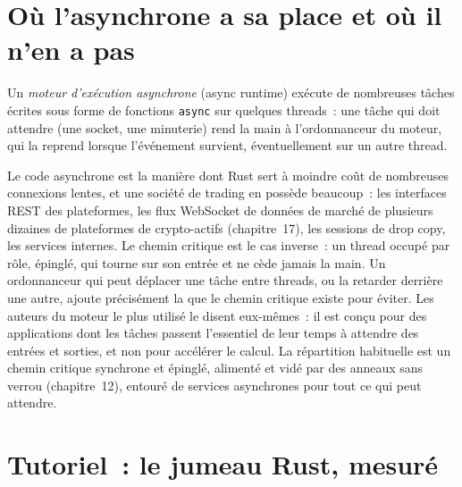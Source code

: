 \label{lst:ll:rust-for-low-latency:pin}

\section{Où l'asynchrone a sa place et où il n'en a pas}

\begin{definition}\label{def:ll:rust-for-low-latency:async}
Un \emph{moteur d'exécution asynchrone} (async runtime) exécute de nombreuses tâches écrites sous forme de fonctions \texttt{async} sur quelques threads~: une tâche
qui doit attendre (une socket, une minuterie) rend la main à l'ordonnanceur du moteur, qui la reprend lorsque l'événement
survient, éventuellement sur un autre thread.
\end{definition}

Le code asynchrone est la manière dont Rust sert à moindre coût de nombreuses connexions lentes, et une société de trading en possède beaucoup~: les interfaces REST des plateformes, les flux WebSocket
de données de marché de plusieurs dizaines de plateformes de crypto-actifs (chapitre~17), les sessions de drop copy, les services internes. Le chemin critique est le
cas inverse~: un thread occupé par rôle, épinglé, qui tourne sur son entrée et ne cède jamais la main. Un ordonnanceur qui peut déplacer une tâche entre
threads, ou la retarder derrière une autre, ajoute précisément la  que le chemin critique existe pour éviter. Les auteurs du moteur le
plus utilisé le disent eux-mêmes~: il est conçu pour des applications dont les tâches passent l'essentiel de leur temps à attendre
des entrées et sorties, et non pour accélérer le calcul. La répartition habituelle est un chemin critique synchrone et épinglé, alimenté et vidé par
des anneaux sans verrou (chapitre~12), entouré de services asynchrones pour tout ce qui peut attendre.

\section{Tutoriel~: le jumeau Rust, mesuré}\label{tut:ll:rust-for-low-latency:tut}

